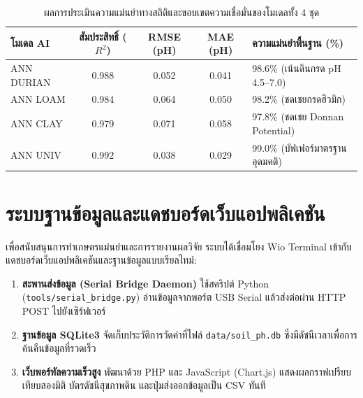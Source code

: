 \documentclass[12pt,a4paper,oneside]{report}
\begin{document}
\begin{table}[htbp]
\centering
\caption{ผลการประเมินความแม่นยำทางสถิติและขอบเขตความเชื่อมั่นของโมเดลทั้ง 4 ชุด}
\label{tab:model_eval}
\begin{tabularx}{\textwidth}{p{3.2cm}cccp{3.5cm}}
\toprule
\textbf{โมเดล AI} & \textbf{สัมประสิทธิ์ ($R^2$)} & \textbf{RMSE (pH)} & \textbf{MAE (pH)} & \textbf{ความแม่นยำพื้นฐาน (\%)} \\
\midrule
ANN DURIAN & 0.988 & 0.052 & 0.041 & 98.6\% (เน้นดินกรด pH 4.5--7.0) \\
ANN LOAM   & 0.984 & 0.064 & 0.050 & 98.2\% (ชดเชยกรดฮิวมิก) \\
ANN CLAY   & 0.979 & 0.071 & 0.058 & 97.8\% (ชดเชย Donnan Potential) \\
ANN UNIV   & 0.992 & 0.038 & 0.029 & 99.0\% (บัฟเฟอร์มาตรฐานอุดมคติ) \\
\bottomrule
\end{tabularx}
\end{table}

\chapter{ระบบฐานข้อมูลและแดชบอร์ดเว็บแอปพลิเคชัน}

เพื่อสนับสนุนการทำเกษตรแม่นยำและการรายงานผลวิจัย ระบบได้เชื่อมโยง Wio Terminal เข้ากับแดชบอร์ดเว็บแอปพลิเคชันและฐานข้อมูลแบบเรียลไทม์:
\begin{enumerate}
    \item \textbf{สะพานส่งข้อมูล (Serial Bridge Daemon)} ใช้สคริปต์ Python (\texttt{tools/serial\_bridge.py}) อ่านข้อมูลจากพอร์ต USB Serial แล้วส่งต่อผ่าน HTTP POST ไปยังเซิร์ฟเวอร์
    \item \textbf{ฐานข้อมูล SQLite3} จัดเก็บประวัติการวัดค่าที่ไฟล์ \texttt{data/soil\_ph.db} ซึ่งมีดัชนีเวลาเพื่อการค้นคืนข้อมูลที่รวดเร็ว
    \item \textbf{เว็บพอร์ทัลความเร็วสูง} พัฒนาด้วย PHP และ JavaScript (Chart.js) แสดงผลกราฟเปรียบเทียบสองมิติ บัตรดัชนีสุขภาพดิน และปุ่มส่งออกข้อมูลเป็น CSV ทันที
\end{enumerate}
\end{document}

